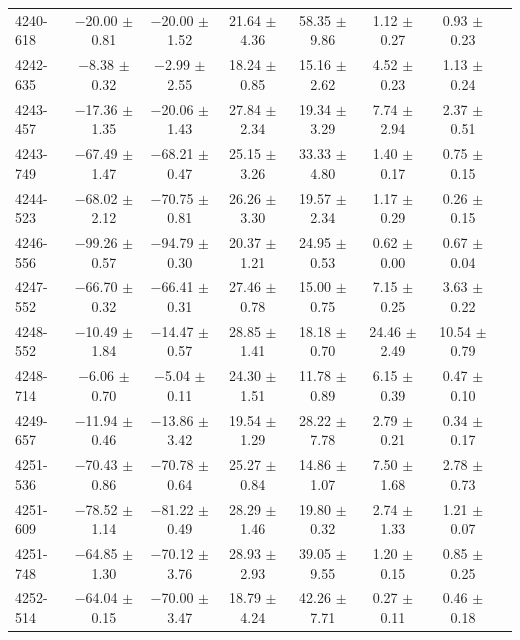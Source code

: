 \documentclass[a4paper,fleqn,usenatbib]{mnras}     %
\begin{document}
\begin{longtable}{l c c c c c c c }
4240-618   &   $-$20.00 $\pm$ 0.81   &   $-$20.00 $\pm$ 1.52   &    21.64 $\pm$ 4.36   &  58.35 $\pm$ 9.86   &   1.12 $\pm$ 0.27   &   0.93 $\pm$ 0.23  \\
4242-635   &    $-$8.38 $\pm$ 0.32   &    $-$2.99 $\pm$ 2.55   &    18.24 $\pm$ 0.85   &  15.16 $\pm$ 2.62   &   4.52 $\pm$ 0.23   &   1.13 $\pm$ 0.24  \\
4243-457   &   $-$17.36 $\pm$ 1.35   &   $-$20.06 $\pm$ 1.43   &    27.84 $\pm$ 2.34   &  19.34 $\pm$ 3.29   &   7.74 $\pm$ 2.94   &   2.37 $\pm$ 0.51  \\
4243-749   &   $-$67.49 $\pm$ 1.47   &   $-$68.21 $\pm$ 0.47   &    25.15 $\pm$ 3.26   &  33.33 $\pm$ 4.80   &   1.40 $\pm$ 0.17   &   0.75 $\pm$ 0.15  \\
4244-523   &   $-$68.02 $\pm$ 2.12   &   $-$70.75 $\pm$ 0.81   &    26.26 $\pm$ 3.30   &  19.57 $\pm$ 2.34   &   1.17 $\pm$ 0.29   &   0.26 $\pm$ 0.15  \\
4246-556   &   $-$99.26 $\pm$ 0.57   &   $-$94.79 $\pm$ 0.30   &    20.37 $\pm$ 1.21   &  24.95 $\pm$ 0.53   &   0.62 $\pm$ 0.00   &   0.67 $\pm$ 0.04  \\
4247-552   &   $-$66.70 $\pm$ 0.32   &   $-$66.41 $\pm$ 0.31   &    27.46 $\pm$ 0.78   &  15.00 $\pm$ 0.75   &   7.15 $\pm$ 0.25   &   3.63 $\pm$ 0.22  \\
4248-552   &   $-$10.49 $\pm$ 1.84   &   $-$14.47 $\pm$ 0.57   &    28.85 $\pm$ 1.41   &  18.18 $\pm$ 0.70   &  24.46 $\pm$ 2.49   &  10.54 $\pm$ 0.79  \\
4248-714   &    $-$6.06 $\pm$ 0.70   &    $-$5.04 $\pm$ 0.11   &    24.30 $\pm$ 1.51   &  11.78 $\pm$ 0.89   &   6.15 $\pm$ 0.39   &   0.47 $\pm$ 0.10  \\
4249-657   &   $-$11.94 $\pm$ 0.46   &   $-$13.86 $\pm$ 3.42   &    19.54 $\pm$ 1.29   &  28.22 $\pm$ 7.78   &   2.79 $\pm$ 0.21   &   0.34 $\pm$ 0.17  \\
4251-536   &   $-$70.43 $\pm$ 0.86   &   $-$70.78 $\pm$ 0.64   &    25.27 $\pm$ 0.84   &  14.86 $\pm$ 1.07   &   7.50 $\pm$ 1.68   &   2.78 $\pm$ 0.73  \\
4251-609   &   $-$78.52 $\pm$ 1.14   &   $-$81.22 $\pm$ 0.49   &    28.29 $\pm$ 1.46   &  19.80 $\pm$ 0.32   &   2.74 $\pm$ 1.33   &   1.21 $\pm$ 0.07  \\
4251-748   &   $-$64.85 $\pm$ 1.30   &   $-$70.12 $\pm$ 3.76   &    28.93 $\pm$ 2.93   &  39.05 $\pm$ 9.55   &   1.20 $\pm$ 0.15   &   0.85 $\pm$ 0.25  \\
4252-514   &   $-$64.04 $\pm$ 0.15   &   $-$70.00 $\pm$ 3.47   &    18.79 $\pm$ 4.24   &  42.26 $\pm$ 7.71   &   0.27 $\pm$ 0.11   &   0.46 $\pm$ 0.18  \\

\end{longtable}
\end{document}
